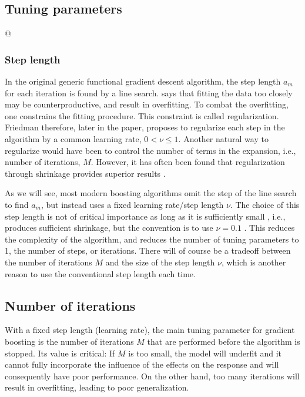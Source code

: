 \subsection{Tuning parameters}@
\subsubsection{Step length}
In the original generic functional gradient descent algorithm, the step length $a_m$ for each iteration is found by a line search.
\citet{friedman2001} says that fitting the data too closely may be counterproductive, and result in overfitting.
To combat the overfitting, one constrains the fitting procedure.
This constraint is called regularization.
Friedman therefore, later in the paper, proposes to regularize each step in the algorithm by a common learning rate, $0<\nu\leq1$.
Another natural way to regularize would have been to control the number of terms in the expansion, i.e., number of iterations, $M$.
However, it has often been found that regularization through shrinkage provides superior results \citep{copas1983}.

As we will see, most modern boosting algorithms omit the step of the line search to find $a_m$, but instead uses a fixed learning rate/step length $\nu$.  
The choice of this step length is not of critical importance as long as it is sufficiently small \citep{schmid-hothorn}, i.e., produces sufficient shrinkage, but the convention is to use $\nu=0.1$ \citep{mayr14a}.
This reduces the complexity of the algorithm, and reduces the number of tuning parameters to 1, the number of steps, or iterations.
There will of course be a tradeoff between the number of iterations $M$ and the size of the step length $\nu$, which is another reason to use the conventional step length each time.

\subsection{Number of iterations}\label{subsec:iterations}
With a fixed step length (learning rate), the main tuning parameter for gradient boosting is the number of iterations $M$ that are performed before the algorithm is stopped.
Its value is critical:
If $M$ is too small, the model will underfit and it cannot fully incorporate the influence of the effects on the response and will consequently have poor performance.
On the other hand, too many iterations will result in overfitting, leading to poor generalization.


